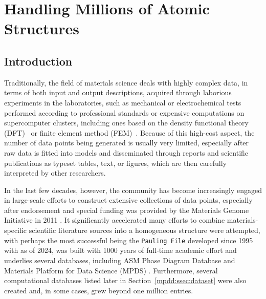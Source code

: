 \chapter{Handling Millions of Atomic Structures} \label{chap:mpdd}



\section{Introduction} \label{mpdd:sec:background}

Traditionally, the field of materials science deals with highly complex data, in terms of both input and output descriptions, acquired through laborious experiments in the laboratories, such as mechanical or electrochemical tests performed according to professional standards or expensive computations on supercomputer clusters, including ones based on the density functional theory (DFT)~\cite{Kohn1996DensityStructure} or finite element method (FEM)~\cite{Liu2022EightyFuture}. Because of this high-cost aspect, the number of data points being generated is usually very limited, especially after raw data is fitted into models and disseminated through reports and scientific publications as typeset tables, text, or figures, which are then carefully interpreted by other researchers.

In the last few decades, however, the community has become increasingly engaged in large-scale efforts to construct extensive collections of data points, especially after endorsement and special funding was provided by the Materials Genome Initiative in 2011 \cite{SubcommitteeontheMaterialsGenomeInitiative2021MaterialsPlan, Agren2023CALPHADAnniversary, Olson2023GenomicDynamics}. It significantly accelerated many efforts to combine materials-specific scientific literature sources into a homogeneous structure were attempted, with perhaps the most successful being the \texttt{Pauling File} developed since 1995 with as of 2024, was built with 1000 years of full-time academic effort \cite{Blokhin2018TheGenome} and underlies several databases, including ASM Phase Diagram Database \cite{ASMInternational} and Materials Platform for Data Science (MPDS) \cite{Blokhin2018TheGenome}. Furthermore, several computational databases listed later in Section~\ref{mpdd:ssec:dataset} were also created and, in some cases, grew beyond one million entries.

